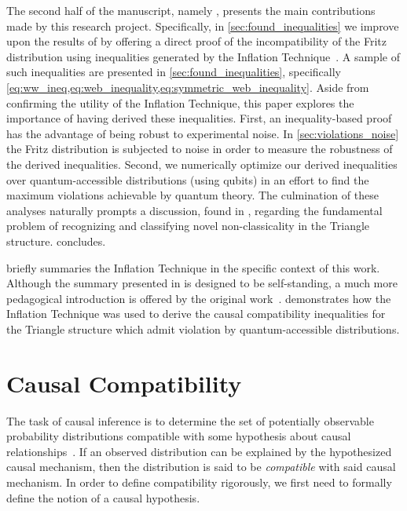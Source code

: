\documentclass[aps, 10pt, english, twoside, pra, nofootinbib, tightenlines, longbibliography, superscriptaddress]{revtex4-1}
\begin{document}
    The second half of the manuscript, namely , presents the main contributions made by this research project. Specifically, in \cref{sec:found_inequalities} we improve upon the results of \citet{Fritz_2012} by offering a direct proof of the incompatibility of the Fritz distribution using inequalities generated by the Inflation Technique~\cite{Inflation}. A sample of such inequalities are presented in \cref{sec:found_inequalities}, specifically \cref{eq:ww_ineq,eq:web_inequality,eq:symmetric_web_inequality}. Aside from confirming the utility of the Inflation Technique, this paper explores the importance of having derived these inequalities. First, an inequality-based proof has the advantage of being robust to experimental noise. In \cref{sec:violations_noise} the Fritz distribution is subjected to noise in order to measure the robustness of the derived inequalities. Second, we numerically optimize our derived inequalities over quantum-accessible distributions (using qubits) in an effort to find the maximum violations achievable by quantum theory. The culmination of these analyses naturally prompts a discussion, found in , regarding the fundamental problem of recognizing and classifying novel non-classicality in the Triangle structure.  concludes.

     briefly summaries the Inflation Technique in the specific context of this work. Although the summary presented in  is designed to be self-standing, a much more pedagogical introduction is offered by the original work~\cite{Inflation}.  demonstrates how the Inflation Technique was used to derive the causal compatibility inequalities for the Triangle structure which admit violation by quantum-accessible distributions.

    \section{Causal Compatibility}
    \label{sec:causal_compatibility}
    The task of causal inference is to determine the set of potentially observable probability distributions compatible with some hypothesis about causal relationships~\cite{Pearl_2009}. If an observed distribution can be explained by the hypothesized causal mechanism, then the distribution is said to be \textit{compatible} with said causal mechanism. In order to define compatibility rigorously, we first need to formally define the notion of a causal hypothesis.
\end{document}

